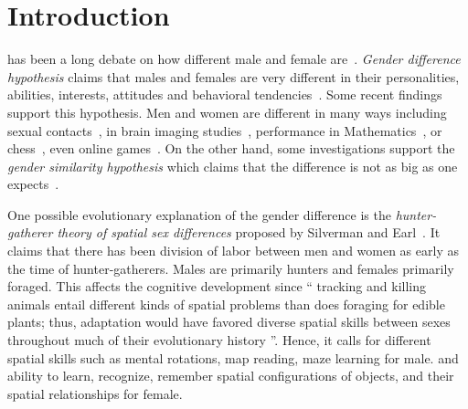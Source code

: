 \documentclass[journal,comsoc]{IEEEtran}
\newcommand{\hbQuote}[1]{``\textsf{{\footnotesize #1}}''}
\newcommand{\hbIdea}[1]{{\color{red}{\scriptsize [{#1}]}}}
\begin{document}
% 
% 
% 
% 
% 



\section{Introduction}

\hbIdea{gender differences} %
has been a long debate on how different male and female are~\cite{
	Darwin1871Book,
	Tannen1991Book,
	Buss2003Book,
	Gray2009Book,
	Liljeros2001Nature,
	Schmitt2008,
	CelaConde2009PNAS,
	Hyde2009PNAS,
	Szell2013SR,
	Blanch2015,
	Hyde2005,
	Zell2015}.
\emph{Gender difference hypothesis} claims that 
males and females are very different in their 
personalities,
abilities,
interests,
attitudes and 
behavioral tendencies~\cite{
	Tannen1991Book,
	Buss2003Book,
	Gray2009Book,
	Liljeros2001Nature,
	Schmitt2008,
	CelaConde2009PNAS,
	Hyde2009PNAS,
	Szell2013SR,
	Blanch2015}.
Some recent findings support this hypothesis.
Men and women are different in many ways including
sexual contacts~\cite{
	Liljeros2001Nature},
in brain imaging studies~\cite{
	CelaConde2009PNAS},
performance in Mathematics~\cite{
	Hyde2009PNAS}, 
or chess~\cite{
	Blanch2015},
even online games~\cite{
	Szell2013SR}.
On the other hand, 
some investigations support the \emph{gender similarity hypothesis} 
which claims that 
the difference is not as big as one expects~\cite{
	Hyde2005,
	Zell2015}.

\hbIdea{hunter-gatherer theory} %
One possible evolutionary explanation of the gender difference is 
the \emph{hunter-gatherer theory of spatial sex differences} 
proposed by Silverman and Earl~\cite{
	Silverman1992}. 
It claims that there has been division of labor between men and women
as early as the time of hunter-gatherers.
Males are primarily hunters and females primarily foraged.
This affects the cognitive development since
\hbQuote{
	tracking and killing animals entail different kinds of spatial problems 
	than does foraging for edible plants; 
	thus,
	adaptation would have favored diverse spatial skills between sexes 
	throughout much of their evolutionary history
}.
Hence, 
it calls for different spatial skills such as
mental rotations,
map reading,
maze learning 
for male.
and
ability to learn, recognize, remember spatial configurations of objects,
and their spatial relationships 
for female.
\end{document}
